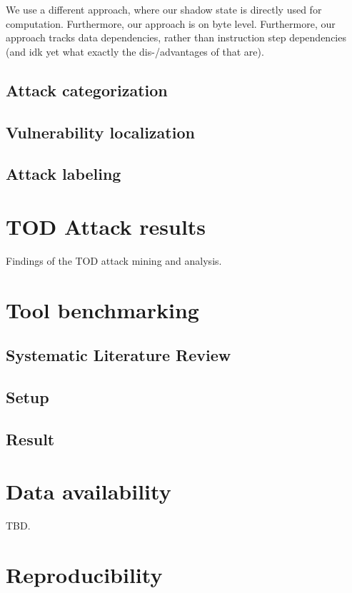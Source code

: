 \documentclass[draft,final]{vutinfth} %
\begin{document}
We use a different approach, where our shadow state is directly used for computation. Furthermore, our approach is on byte level. Furthermore, our approach tracks data dependencies, rather than instruction step dependencies (and idk yet what exactly the dis-/advantages of that are).

\section{Attack categorization}

\section{Vulnerability localization}

\section{Attack labeling}

\chapter{TOD Attack results}

Findings of the TOD attack mining and analysis.

\chapter{Tool benchmarking}

\section{Systematic Literature Review}

\section{Setup}

\section{Result}

\chapter{Data availability}

TBD.

\chapter{Reproducibility}
\label{cha:reproducibility}
\end{document}
